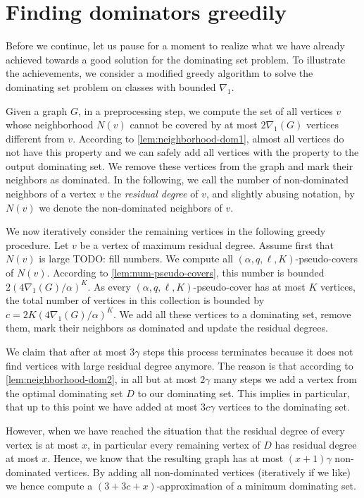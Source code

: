 
\section{Finding dominators greedily}

Before we continue, let us pause for a moment to realize what we
have already achieved towards a good solution for the dominating set
problem. To illustrate the achievements, we consider a modified
greedy algorithm to solve the dominating set problem on classes with
bounded $\nabla_1$.

Given a graph $G$, in a preprocessing step,
we compute the set
of all vertices $v$ whose neighborhood $N(v)$ cannot be covered
by at most $2\nabla_1(G)$ vertices different from $v$. According
to \cref{lem:neighborhood-dom1}, almost all vertices do not
have this property and we can safely add all vertices with the property
to the output dominating set. We remove these vertices from the
graph and mark their neighbors as dominated. In the following, we call
the number of non-dominated neighbors of a vertex $v$ the \emph{residual
degree} of $v$, and slightly abusing notation, by $N(v)$
we denote the non-dominated neighbors of $v$.

We now iteratively consider the remaining vertices in the following
greedy procedure. Let $v$ be a vertex of maximum residual degree.
Assume first that~$N(v)$ is large TODO: fill numbers.
We compute all $(\alpha, q,\ell,K)$-pseudo-covers of $N(v)$.
According to \cref{lem:num-pseudo-covers}, this number is
bounded $2(4\nabla_1(G)/\alpha)^K$. As every
$(\alpha, q,\ell,K)$-pseudo-cover has at most $K$ vertices,
the total number of vertices in this collection is bounded by
$c=2K(4\nabla_1(G)/\alpha)^K$. We add all these vertices
to a dominating set, remove them, mark their neighbors as
dominated and update the residual degrees.

We claim that after at most $3\gamma$ steps this process terminates
because it does not find vertices with large residual degree anymore.
The reason is that according to \cref{lem:neighborhood-dom2},
in all but at most $2\gamma$ many steps we add a vertex from the
optimal dominating set $D$ to our dominating set. This implies in particular,
that up to this point we have added at most $3c\gamma$ vertices
to the dominating set.

However, when we have reached the situation that the residual degree
of every vertex is at most $x$, in particular every remaining vertex of
$D$ has residual degree at most $x$. Hence, we know that the resulting
graph has at most $(x+1)\gamma$ non-dominated vertices. By adding all
non-dominated vertices (iteratively if we like) we hence compute a $(3+3c+x)$-approximation of a minimum dominating set.

